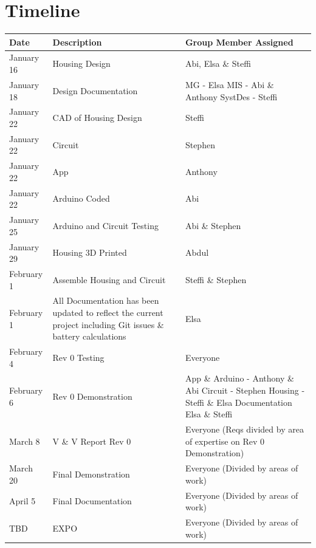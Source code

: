 \documentclass[12pt, titlepage]{article}
\begin{document}
\section{Timeline}

\begin{minipage}{\textwidth}
\renewcommand*{\arraystretch}{1.5}
\begin{tabular}{| p{} | p{} | p{} |}
 \hline
 Date & Description & Group Member Assigned\\ 
 \hline
 January 16 & Housing Design & Abi, Elsa \& Steffi\\ 
 \hline
 January 18 & Design Documentation & MG - Elsa \newline MIS - Abi \& Anthony \newline SystDes - Steffi\\ 
  \hline
  January 22 & CAD of Housing Design & Steffi\\ 
  \hline
    January 22 & Circuit & Stephen\\ 
  \hline
    January 22 & App & Anthony\\ 
    \hline
    January 22 & Arduino Coded & Abi\\ 
  \hline
   January 25 & Arduino and Circuit Testing & Abi \& Stephen\\ 
  \hline
   January 29 & Housing 3D Printed & Abdul\\ 
  \hline
    February 1& Assemble Housing and Circuit & Steffi \& Stephen\\ 
  \hline
   February 1& All Documentation has been updated to reflect the current project including Git issues \& battery calculations& Elsa\\ 
  \hline
      February 4 & Rev 0 Testing & Everyone\\ 
  \hline
  February 6 & Rev 0 Demonstration & App \& Arduino - Anthony \& Abi \newline Circuit - Stephen \newline Housing - Steffi \& Elsa \newline Documentation Elsa \& Steffi\\
  \hline
  March 8 & V \& V Report Rev 0 & Everyone \newline(Reqs divided by area of expertise on Rev 0 Demonstration)\\
  \hline
 March 20 & Final Demonstration & Everyone \newline(Divided by areas of work)\\
 \hline
 April 5 & Final Documentation & Everyone \newline(Divided by areas of work)\\
 \hline
 TBD & EXPO & Everyone (Divided by areas of work)\\
 \hline
\end{tabular}
\end{minipage}\\
\end{document}
